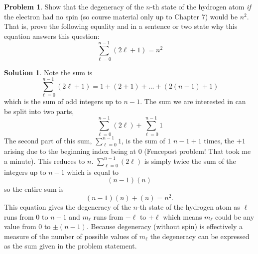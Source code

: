 \documentclass[10pt]{article}
\theoremstyle{definition}
\newtheorem{problem}{Problem}
\newtheorem{soln}{Solution}
\begin{document}
\begin{problem}
Show that the degeneracy of the $n$-th state of the hydrogen atom \emph{if} the electron had no spin (so course
material only up to Chapter 7) would be $n^2$. That is, prove the following equality and in a sentence or two
state why this equation answers this question:
$$\sum_{\ell=0}^{n-1}\left(2\ell+1\right)=n^2$$
\end{problem}
\begin{soln}
  Note the sum is
  $$\sum_{\ell=0}^{n-1}(2\ell+1)=1+(2+1)+\dots+(2(n-1)+1)$$
  which is the sum of odd integers up to $n-1$. The sum we are interested in can be split into two parts,
  $$\sum_{\ell=0}^{n-1}(2\ell)+\sum_{\ell=0}^{n-1}1$$
  The second part of this sum, $\sum_{\ell=0}^{n-1}1$, is the sum of $1$ $n-1+1$ times, the $+1$ arising due to the beginning index being at
  $0$ (Fencepost problem! That took me a minute). This reduces to $n$.
  $\sum_{\ell=0}^{n-1}(2\ell)$ is simply twice the sum of the integers up to $n-1$ which is equal to
  $$(n-1)(n)$$
  so the entire sum is
  $$(n-1)(n)+(n)=n^2.$$
  This equation gives the degeneracy of the $n$-th state of the hydrogen atom as $\ell$ runs from $0$ to $n-1$ and $m_\ell$ runs from $-\ell$ to $+\ell$
  which means $m_\ell$ could be any value from $0$ to $\pm(n-1)$. Because degeneracy (without spin) is effectively a
  measure of the number of possible values of $m_\ell$ the degeneracy can be expressed as the sum given in the problem statement.
\end{soln}
\newpage
\end{document}
